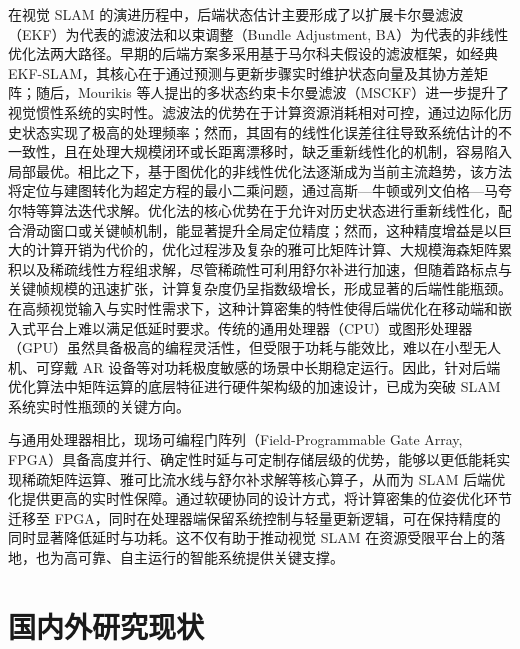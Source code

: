 \begin{figure}[htbp]
    \centering
    \resizebox{0.92\linewidth}{!}{}
    \label{fig:visual_slam_pipeline}
\end{figure}

在视觉 SLAM 的演进历程中，后端状态估计主要形成了以扩展卡尔曼滤波（EKF）为代表的滤波法和以束调整（Bundle Adjustment, BA）为代表的非线性优化法两大路径。早期的后端方案多采用基于马尔科夫假设的滤波框架，如经典 EKF-SLAM\cite{smith1990estimating}，其核心在于通过预测与更新步骤实时维护状态向量及其协方差矩阵；随后，Mourikis 等人提出的多状态约束卡尔曼滤波（MSCKF）\cite{mourikis2007multi}进一步提升了视觉惯性系统的实时性。滤波法的优势在于计算资源消耗相对可控，通过边际化历史状态实现了极高的处理频率；然而，其固有的线性化误差往往导致系统估计的不一致性，且在处理大规模闭环或长距离漂移时，缺乏重新线性化的机制，容易陷入局部最优。相比之下，基于图优化的非线性优化法\cite{kummerle2011g}逐渐成为当前主流趋势，该方法将定位与建图转化为超定方程的最小二乘问题，通过高斯—牛顿或列文伯格—马夸尔特等算法迭代求解\cite{triggs1999bundle}。优化法的核心优势在于允许对历史状态进行重新线性化，配合滑动窗口或关键帧机制\cite{leutenegger2015keyframe}，能显著提升全局定位精度；然而，这种精度增益是以巨大的计算开销为代价的，优化过程涉及复杂的雅可比矩阵计算、大规模海森矩阵累积以及稀疏线性方程组求解，尽管稀疏性可利用舒尔补进行加速，但随着路标点与关键帧规模的迅速扩张，计算复杂度仍呈指数级增长，形成显著的后端性能瓶颈。在高频视觉输入与实时性需求下，这种计算密集的特性使得后端优化在移动端和嵌入式平台上难以满足低延时要求。传统的通用处理器（CPU）或图形处理器（GPU）虽然具备极高的编程灵活性，但受限于功耗与能效比，难以在小型无人机、可穿戴 AR 设备等对功耗极度敏感的场景中长期稳定运行。因此，针对后端优化算法中矩阵运算的底层特征进行硬件架构级的加速设计，已成为突破 SLAM 系统实时性瓶颈的关键方向。

与通用处理器相比，现场可编程门阵列（Field-Programmable Gate Array, FPGA）具备高度并行、确定性时延与可定制存储层级的优势，能够以更低能耗实现稀疏矩阵运算、雅可比流水线与舒尔补求解等核心算子，从而为 SLAM 后端优化提供更高的实时性保障\cite{huangkun2025vslam}。通过软硬协同的设计方式，将计算密集的位姿优化环节迁移至 FPGA，同时在处理器端保留系统控制与轻量更新逻辑，可在保持精度的同时显著降低延时与功耗。这不仅有助于推动视觉 SLAM 在资源受限平台上的落地，也为高可靠、自主运行的智能系统提供关键支撑。

\section{国内外研究现状}

